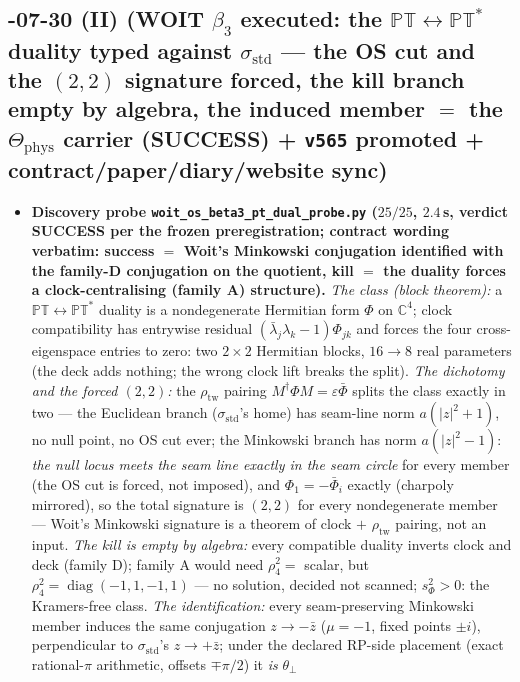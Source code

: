 \documentclass[11pt]{article}
\begin{document}
\subsection*{-07-30 (II) (WOIT $\beta_3$ executed: the $\mathbb{PT}\leftrightarrow\mathbb{PT}^*$ duality typed against $\sigma_{\mathrm{std}}$ --- the OS cut and the $(2,2)$ signature forced, the kill branch empty by algebra, the induced member $=$ the $\Theta_{\mathrm{phys}}$ carrier (SUCCESS) + \texttt{v565} promoted + contract/paper/diary/website sync)}
\begin{itemize}[leftmargin=1.5em]
\item \textbf{Discovery probe \texttt{woit\_os\_beta3\_pt\_dual\_probe.py} ($25/25$, $2.4$\,s,
verdict SUCCESS per the frozen preregistration; contract wording verbatim: success $=$ Woit's
Minkowski conjugation identified with the family-D conjugation on the quotient, kill $=$ the
duality forces a clock-centralising (family A) structure).} \emph{The class (block theorem):}
a $\mathbb{PT}\leftrightarrow\mathbb{PT}^*$ duality is a nondegenerate Hermitian form $\Phi$
on $\mathbb{C}^4$; clock compatibility has entrywise residual $(\bar\lambda_j\lambda_k-1)\Phi_{jk}$
and forces the four cross-eigenspace entries to zero: two $2\times2$ Hermitian blocks,
$16\to8$ real parameters (the deck adds nothing; the wrong clock lift breaks the split).
\emph{The dichotomy and the forced $(2,2)$:} the $\rho_{\mathrm{tw}}$ pairing
$M^\dagger\Phi M=\varepsilon\bar\Phi$ splits the class exactly in two --- the Euclidean
branch ($\sigma_{\mathrm{std}}$'s home) has seam-line norm $a(|z|^2+1)$, no null point, no OS
cut ever; the Minkowski branch has norm $a(|z|^2-1)$: \emph{the null locus meets the seam
line exactly in the seam circle} for every member (the OS cut is forced, not imposed), and
$\Phi_1=-\bar\Phi_i$ exactly (charpoly mirrored), so the total signature is $(2,2)$ for every
nondegenerate member --- Woit's Minkowski signature is a theorem of clock $+$
$\rho_{\mathrm{tw}}$ pairing, not an input. \emph{The kill is empty by algebra:} every
compatible duality inverts clock and deck (family D); family A would need $\rho_4^2=$
scalar, but $\rho_4^2=\operatorname{diag}(-1,1,-1,1)$ --- no solution, decided not scanned;
$s_\Phi^2>0$: the Kramers-free class. \emph{The identification:} every seam-preserving
Minkowski member induces the same conjugation $z\to-\bar z$ ($\mu=-1$, fixed points $\pm i$),
perpendicular to $\sigma_{\mathrm{std}}$'s $z\to+\bar z$; under the declared RP-side
placement (exact rational-$\pi$ arithmetic, offsets $\mp\pi/2$) it \emph{is} $\theta_\perp$

\end{itemize}
\end{document}
